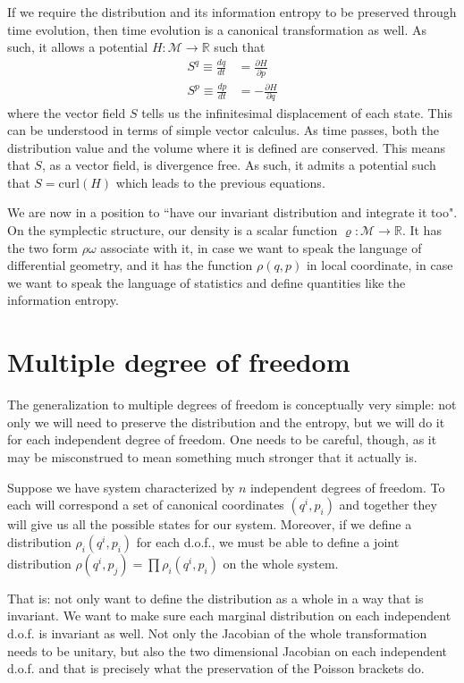 \documentclass[smallextended]{svjour3}
\numberwithin{equation}{section}
\theoremstyle{definition}
\begin{document}
If we require the distribution and its information entropy to be preserved through time evolution, then time evolution is a canonical transformation as well. As such, it allows a potential $H : \mathcal{M} \rightarrow \mathbb{R}$ such that
\begin{align}
S^q \equiv \frac{dq}{dt} &= \frac{\partial H}{\partial p} \\
S^p \equiv \frac{dp}{dt} &= - \frac{\partial H}{\partial q}
\end{align} 
where the vector field $S$ tells us the infinitesimal displacement of each state. This can be understood in terms of simple vector calculus. As time passes, both the distribution value and the volume where it is defined are conserved. This means that $S$, as a vector field, is divergence free. As such, it admits a potential such that $S = \mathrm{curl}(H)$ which leads to the previous equations.


We are now in a position to ``have our invariant distribution and integrate it too". On the symplectic structure, our density is a scalar function $\varrho : \mathcal{M} \rightarrow \mathbb{R}$. It has the two form $\rho \omega$ associate with it, in case we want to speak the language of differential geometry, and it has the function $\rho(q,p)$ in local coordinate, in case we want to speak the language of statistics and define quantities like the information entropy.

\section{Multiple degree of freedom}

The generalization to multiple degrees of freedom is conceptually very simple: not only we will need to preserve the distribution and the entropy, but we will do it for each independent degree of freedom. One needs to be careful, though, as it may be misconstrued to mean something much stronger that it actually is.

Suppose we have system characterized by $n$ independent degrees of freedom. To each will correspond a set of canonical coordinates $(q^i, p_i)$ and together they will give us all the possible states for our system. Moreover, if we define a distribution $\rho_i(q^i,p_i)$ for each d.o.f., we must be able to define a joint distribution $\rho(q^i,p_j) = \prod \rho_i(q^i,p_i)$ on the whole system.

That is: not only want to define the distribution as a whole in a way that is invariant. We want to make sure each marginal distribution on each independent d.o.f. is invariant as well. Not only the Jacobian of the whole transformation needs to be unitary, but also the two dimensional Jacobian on each independent d.o.f. and that is precisely what the preservation of the Poisson brackets do.
\end{document}
